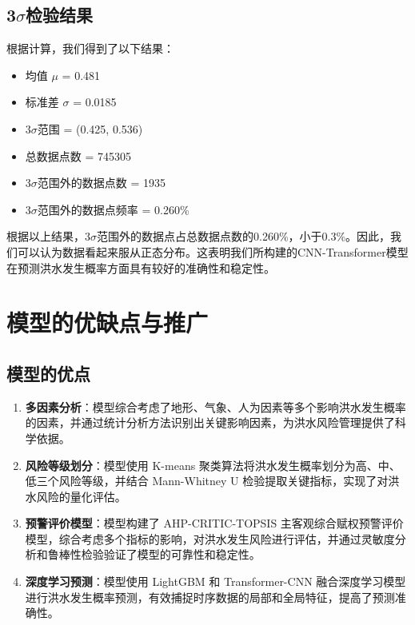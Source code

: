 \documentclass[withoutpreface,bwprint]{cumcmthesis} %
\begin{document}
\subsection{3$\sigma$检验结果}
根据计算，我们得到了以下结果：
\begin{itemize}
	\item 均值 $\mu$ = 0.481
	\item 标准差 $\sigma$ = 0.0185
	\item 3$\sigma$范围 = (0.425, 0.536)
	\item 总数据点数 = 745305
	\item 3$\sigma$范围外的数据点数 = 1935
	\item 3$\sigma$范围外的数据点频率 = 0.260\%
\end{itemize}

根据以上结果，3$\sigma$范围外的数据点占总数据点数的0.260\%，小于0.3\%。因此，我们可以认为数据看起来服从正态分布。这表明我们所构建的CNN-Transformer模型在预测洪水发生概率方面具有较好的准确性和稳定性。


\section{模型的优缺点与推广}
\subsection{模型的优点}
\begin{enumerate}
	\item \textbf{多因素分析}：模型综合考虑了地形、气象、人为因素等多个影响洪水发生概率的因素，并通过统计分析方法识别出关键影响因素，为洪水风险管理提供了科学依据。
	\item \textbf{风险等级划分}：模型使用 K-means 聚类算法将洪水发生概率划分为高、中、低三个风险等级，并结合 Mann-Whitney U 检验提取关键指标，实现了对洪水风险的量化评估。
	\item \textbf{预警评价模型}：模型构建了 AHP-CRITIC-TOPSIS 主客观综合赋权预警评价模型，综合考虑多个指标的影响，对洪水发生风险进行评估，并通过灵敏度分析和鲁棒性检验验证了模型的可靠性和稳定性。
	\item \textbf{深度学习预测}：模型使用 LightGBM 和 Transformer-CNN 融合深度学习模型进行洪水发生概率预测，有效捕捉时序数据的局部和全局特征，提高了预测准确性。
\end{enumerate}
\end{document}
